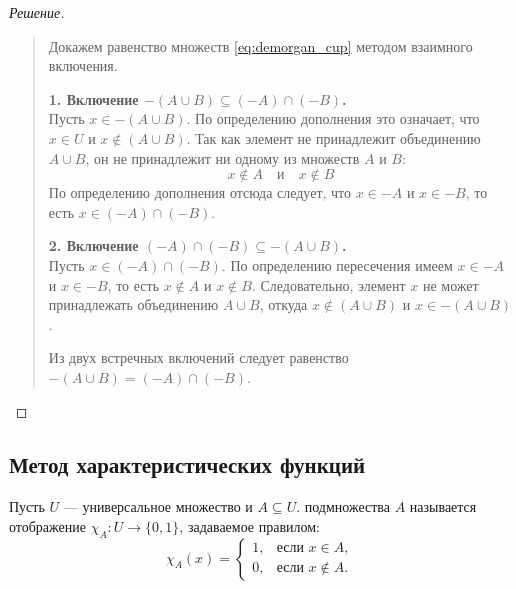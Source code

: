 \begin{proof}[Решение]~\\
    \begin{quote}
        Докажем равенство множеств \eqref{eq:demorgan_cup} методом 
        взаимного включения.

        \textbf{1. Включение $-(A \cup B) \subseteq (-A) \cap (-B)$.}\\
        Пусть $x \in -(A \cup B)$. По определению дополнения это означает, 
        что $x \in U$ и $x \notin (A \cup B)$. Так как элемент не 
        принадлежит объединению $A \cup B$, он не принадлежит ни одному из 
        множеств $A$ и $B$:
        \[
            x \notin A \quad \text{и} \quad x \notin B
        \]
        По определению дополнения отсюда следует, что $x \in -A$ и 
        $x \in -B$, то есть $x \in (-A) \cap (-B)$.

        \textbf{2. Включение $(-A) \cap (-B) \subseteq -(A \cup B)$.}\\
        Пусть $x \in (-A) \cap (-B)$. По определению пересечения имеем 
        $x \in -A$ и $x \in -B$, то есть $x \notin A$ и $x \notin B$. 
        Следовательно, элемент $x$ не может принадлежать объединению 
        $A \cup B$, откуда $x \notin (A \cup B)$ и $x \in -(A \cup B)$.

        Из двух встречных включений следует равенство 
        $-(A \cup B) = (-A) \cap (-B)$.
    \end{quote}
\end{proof}

\subsection{Метод характеристических функций}

\begin{definition}
    Пусть $U$ --- универсальное множество и $A \subseteq U$. 
     подмножества $A$ 
    называется отображение $\chi_A: U \to \{0, 1\}$, задаваемое правилом:
    \begin{equation} \label{eq:char_func_def}
        \chi_A(x) = 
        \begin{cases}
            1, & \text{если } x \in A, \\
            0, & \text{если } x \notin A.
        \end{cases} \tag{7}
    \end{equation}
\end{definition}

